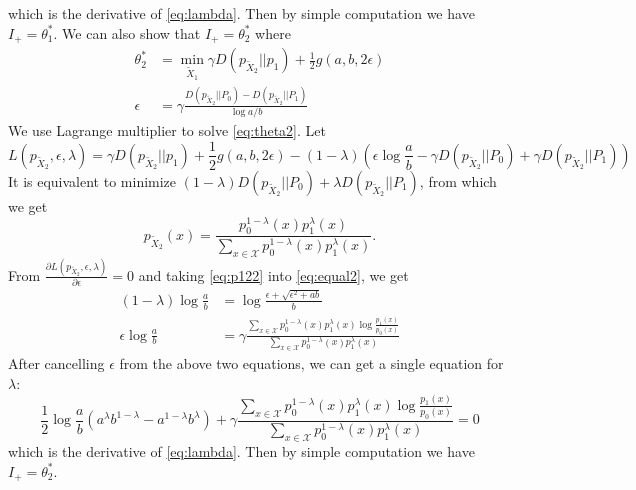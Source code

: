 \documentclass{article}
\begin{document}
which is the derivative of \eqref{eq:lambda}.
Then by simple computation we have
$I_+ = \theta_1^*$.
We can also show that $I_+=\theta_2^*$
where
\begin{align}
\theta^*_2 &= \min_{\widetilde{X}_1} \gamma D(p_{\widetilde{X}_2}|| p_1)+ \frac{1}{2} g(a,b, 2\epsilon)  \label{eq:theta2}\\
\epsilon &= \gamma \frac{D(p_{\widetilde{X}_2} || P_0) - D(p_{\widetilde{X}_2} || P_1) }{\log a /b}\label{eq:equal2}
\end{align}
We use Lagrange multiplier to solve \eqref{eq:theta2}.
Let
$$
L(p_{\widetilde{X}_2},\epsilon, \lambda)
=\gamma D(p_{\widetilde{X}_2}|| p_1)+ \frac{1}{2} g(a,b, 2\epsilon) - (1-\lambda)(\epsilon \log\frac{a}{b}-\gamma
D(p_{\widetilde{X}_2} || P_0) + \gamma D(p_{\widetilde{X}_2} || P_1))
$$
It is equivalent to minimize
$(1-\lambda)D(p_{\widetilde{X}_2} || P_0) +
\lambda D(p_{\widetilde{X}_2} || P_1) $, from
which we get
\begin{equation}\label{eq:p122}
p_{\widetilde{X}_2}(x) = \frac{p_0^{1-\lambda}(x)p_1^{\lambda}(x)}{\sum_{x \in \mathcal{X}}p_0^{1-\lambda}(x) p_1^{\lambda} (x)}.
\end{equation}
From $\frac{\partial L(p_{\widetilde{X}_2},\epsilon, \lambda)}{\partial \epsilon}=0$ and taking \eqref{eq:p122}
into \eqref{eq:equal2}, we get
\begin{align*}
    (1-\lambda) \log \frac{a}{b}
    & = \log \frac{\epsilon + \sqrt{\epsilon^2+ab}}{b} \\
    \epsilon \log \frac{a}{b}
    & = \gamma\frac{\sum_{x \in \mathcal{X}}p_0^{1-\lambda}(x) p_1^{\lambda} (x)\log \frac{p_1(x)}{p_0(x)}}{\sum_{x \in \mathcal{X}}p_0^{1-\lambda}(x) p_1^{\lambda} (x)}
\end{align*}
After cancelling $\epsilon$
from the above two equations, we can get a single equation
for $\lambda$:
\begin{equation}
    \frac{1}{2}\log\frac{a}{b}
    (a^{\lambda} b^{1-\lambda}
    -a^{1-\lambda} b^{\lambda})
    + \gamma \frac{\sum_{x \in \mathcal{X}}p_0^{1-\lambda}(x) p_1^{\lambda} (x)\log \frac{p_1(x)}{p_0(x)}}{\sum_{x \in \mathcal{X}}p_0^{1-\lambda}(x) p_1^{\lambda} (x)}=0
\end{equation}
which is the derivative of \eqref{eq:lambda}.
Then by simple computation we have
$I_+ = \theta_2^*$.
\end{document}
